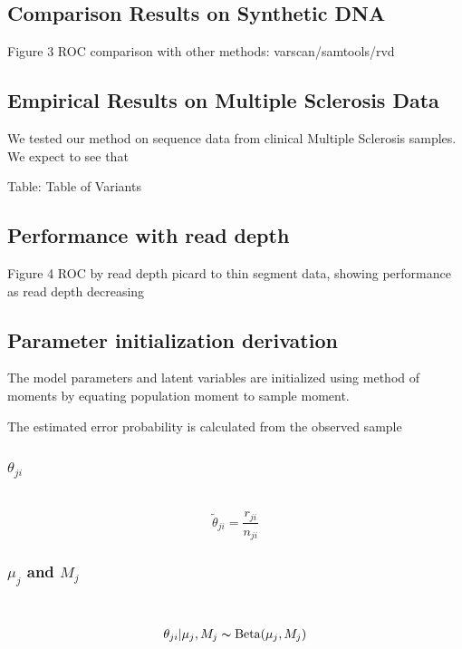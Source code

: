 \documentclass[11pt,reqno]{amsart}
\begin{document}
\subsection{Comparison Results on Synthetic DNA}
Figure 3 ROC comparison with other methods: varscan/samtools/rvd
\subsection{Empirical Results on Multiple Sclerosis Data}
We tested our method on sequence data from clinical Multiple Sclerosis samples. We expect to see that 

Table: Table of Variants
\subsection{Performance with read depth}
Figure 4 ROC by read depth
picard to thin segment data, showing performance as read depth decreasing

\appendix
\subsection{Parameter initialization derivation}
The model parameters and latent variables are initialized using method of moments by equating population moment to sample moment. 

The estimated error probability is calculated from the observed sample
\subsubsection{$\theta_{ji}$}\
\begin{equation}
 \tilde{\theta}_{ji}=\frac{r_{ji}}{n_{ji}}
\end{equation}

\subsubsection{$\mu_j$ and $M_j$}\
\begin{align}
 \theta_{ji}|\mu_j,M_j\thicksim \text{Beta}(\mu_j,M_j)
\end{align}
\end{document}
